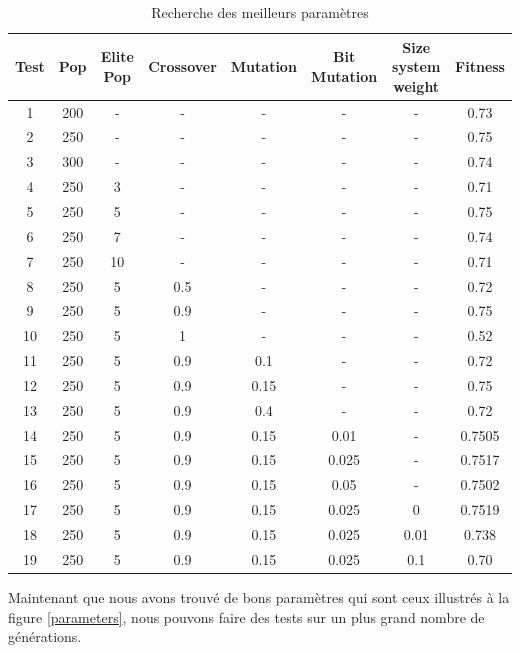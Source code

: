 \begin{table}[h!]
   \centering
   \begin{tabular}{|c|c|c|c|c|c|c|c|}
      \hline
      Test & Pop & Elite Pop & Crossover & Mutation & Bit Mutation & Size system weight & Fitness\\
      \hline
      1 & 200 & - & - & - & - & - & 0.73\\
      \rowcolor{very-light-gray}
      2 & 250 & - & - & - & - & - & 0.75\\
      3 & 300 & - & - & - & - & - & 0.74\\
      \hline
      4 & 250 & 3 & - & - & - & - & 0.71\\
      \rowcolor{very-light-gray}
      5 & 250 & 5 & - & - & - & - & 0.75\\
      6 & 250 & 7 & - & - & - & - & 0.74\\
      7 & 250 & 10 & - & - & - & - & 0.71\\
      \hline
      8 & 250 & 5 & 0.5 & - & - & - & 0.72\\
      \rowcolor{very-light-gray}
      9 & 250 & 5 & 0.9 & - & - & - & 0.75\\
      10 & 250 & 5 & 1 & - & - & - & 0.52\\
      \hline
      11 & 250 & 5 & 0.9 & 0.1 & - & - & 0.72\\
      \rowcolor{very-light-gray}
      12 & 250 & 5 & 0.9 & 0.15 & - & - & 0.75\\
      13 & 250 & 5 & 0.9 & 0.4 & - & - & 0.72\\
      \hline
      14 & 250 & 5 & 0.9 & 0.15 & 0.01 & - & 0.7505\\
      \rowcolor{very-light-gray}
      15 & 250 & 5 & 0.9 & 0.15 & 0.025 & - & 0.7517\\
      16 & 250 & 5 & 0.9 & 0.15 & 0.05 & - & 0.7502\\
      \hline
      \rowcolor{very-light-gray}
      17 & 250 & 5 & 0.9 & 0.15 & 0.025 & 0 & 0.7519\\
      18 & 250 & 5 & 0.9 & 0.15 & 0.025 & 0.01 & 0.738\\
      19 & 250 & 5 & 0.9 & 0.15 & 0.025 & 0.1 & 0.70\\
      \hline
   \end{tabular}
   \caption{\label{searchparameters} Recherche des meilleurs paramètres}
\end{table}



Maintenant que nous avons trouvé de bons paramètres qui sont ceux illustrés à la figure \ref{parameters}, nous pouvons faire des tests sur un plus grand nombre de générations.


